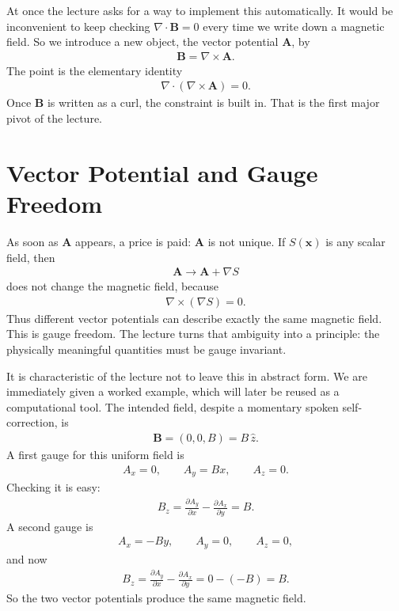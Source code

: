 At once the lecture asks for a way to implement this automatically. It would be inconvenient to keep checking \(\nabla\!\cdot\!\mathbf B=0\) every time we write down a magnetic field. So we introduce a new object, the vector potential \(\mathbf A\), by
\begin{align}
\mathbf B = \nabla\times \mathbf A.
\end{align}
The point is the elementary identity
\begin{align}
\nabla\!\cdot\!(\nabla\times \mathbf A)=0.
\end{align}
Once \(\mathbf B\) is written as a curl, the constraint is built in. That is the first major pivot of the lecture.

\section{Vector Potential and Gauge Freedom}

As soon as \(\mathbf A\) appears, a price is paid: \(\mathbf A\) is not unique. If \(S(\mathbf x)\) is any scalar field, then
\begin{align}
\mathbf A \longrightarrow \mathbf A+\nabla S
\end{align}
does not change the magnetic field, because
\begin{align}
\nabla\times(\nabla S)=0.
\end{align}
Thus different vector potentials can describe exactly the same magnetic field. This is gauge freedom. The lecture turns that ambiguity into a principle: the physically meaningful quantities must be gauge invariant.

It is characteristic of the lecture not to leave this in abstract form. We are immediately given a worked example, which will later be reused as a computational tool. The intended field, despite a momentary spoken self-correction, is
\begin{align}
\mathbf B=(0,0,B)=B\,\hat z.
\end{align}
A first gauge for this uniform field is
\begin{align}
A_x=0,\qquad A_y=Bx,\qquad A_z=0.
\end{align}
Checking it is easy:
\begin{align}
B_z=\frac{\partial A_y}{\partial x}-\frac{\partial A_x}{\partial y}=B.
\end{align}
A second gauge is
\begin{align}
A_x=-By,\qquad A_y=0,\qquad A_z=0,
\end{align}
and now
\begin{align}
B_z=\frac{\partial A_y}{\partial x}-\frac{\partial A_x}{\partial y}=0-(-B)=B.
\end{align}
So the two vector potentials produce the same magnetic field.

